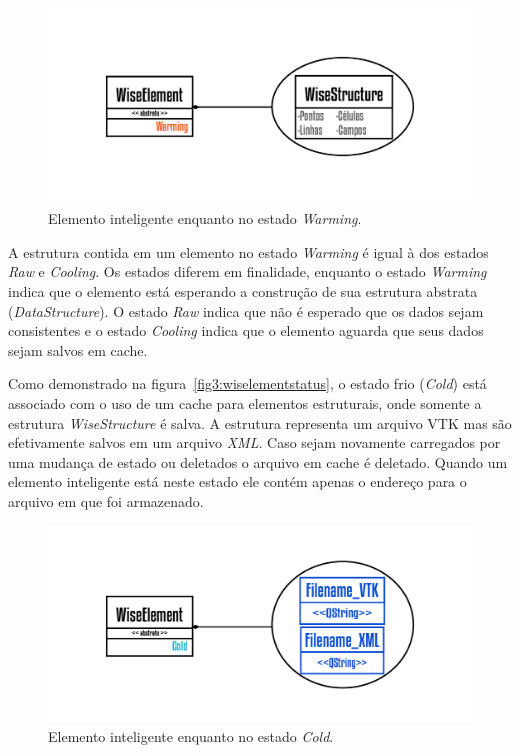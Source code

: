 \documentclass[
        english,			
        brazil			        %
        ,<...>]{abntbibufjf}
\begin{document}
\begin{figure}[!htbp]
	\centering
	\includegraphics[scale=1]{Figures/WiseElementWarming.png}
	\caption{Elemento inteligente enquanto no estado \textit{Warming}.}
	\label{fig4:wiselementwarming}
\end{figure}

A estrutura contida em um elemento no estado \textit{Warming} é igual à dos estados \textit{Raw} e \textit{Cooling}. Os estados diferem em finalidade, enquanto o estado \textit{Warming} indica que o elemento está esperando a construção de sua estrutura abstrata (\textit{DataStructure}). O estado \textit{Raw} indica que não é esperado que os dados sejam consistentes e o estado \textit{Cooling} indica que o elemento aguarda que seus dados sejam salvos em cache.

Como demonstrado na figura~\ref{fig3:wiselementstatus}, o estado frio (\textit{Cold}) está associado com o uso de um cache para elementos estruturais, onde somente a estrutura \textit{WiseStructure} é salva. A estrutura representa um arquivo VTK mas são efetivamente salvos em um arquivo \textit{XML}. Caso sejam novamente carregados por uma mudança de estado ou deletados o arquivo em cache é deletado. Quando um elemento inteligente está neste estado ele contém apenas o endereço para o arquivo em que foi armazenado.

\begin{figure}[!htbp]
	\centering
	\includegraphics[scale=1]{Figures/WiseElementCold.png}
	\caption{Elemento inteligente enquanto no estado \textit{Cold}.}
	\label{fig5:wiselementcold}
\end{figure}
\end{document}
